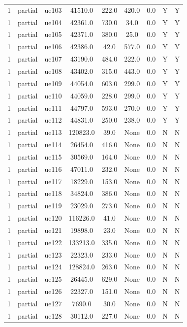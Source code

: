 \begin{table}[ht]
\begin{tabular}{|c|c|c|c|c|c|c|c|c|}
1 & partial & ue103 & 41510.0 & 222.0 & 420.0 & 0.0 & Y & Y \\
1 & partial & ue104 & 42361.0 & 730.0 & 34.0 & 0.0 & Y & Y \\
1 & partial & ue105 & 42371.0 & 380.0 & 25.0 & 0.0 & Y & Y \\
1 & partial & ue106 & 42386.0 & 42.0 & 577.0 & 0.0 & Y & Y \\
1 & partial & ue107 & 43190.0 & 484.0 & 222.0 & 0.0 & Y & Y \\
1 & partial & ue108 & 43402.0 & 315.0 & 443.0 & 0.0 & Y & Y \\
1 & partial & ue109 & 44054.0 & 603.0 & 299.0 & 0.0 & Y & Y \\
1 & partial & ue110 & 44059.0 & 228.0 & 299.0 & 0.0 & Y & Y \\
1 & partial & ue111 & 44797.0 & 593.0 & 270.0 & 0.0 & Y & Y \\
1 & partial & ue112 & 44831.0 & 250.0 & 238.0 & 0.0 & Y & Y \\
1 & partial & ue113 & 120823.0 & 39.0 & None & 0.0 & N & N \\
1 & partial & ue114 & 26454.0 & 416.0 & None & 0.0 & N & N \\
1 & partial & ue115 & 30569.0 & 164.0 & None & 0.0 & N & N \\
1 & partial & ue116 & 47011.0 & 232.0 & None & 0.0 & N & N \\
1 & partial & ue117 & 18229.0 & 153.0 & None & 0.0 & N & N \\
1 & partial & ue118 & 34824.0 & 386.0 & None & 0.0 & N & N \\
1 & partial & ue119 & 23029.0 & 273.0 & None & 0.0 & N & N \\
1 & partial & ue120 & 116226.0 & 41.0 & None & 0.0 & N & N \\
1 & partial & ue121 & 19898.0 & 23.0 & None & 0.0 & N & N \\
1 & partial & ue122 & 133213.0 & 335.0 & None & 0.0 & N & N \\
1 & partial & ue123 & 22323.0 & 233.0 & None & 0.0 & N & N \\
1 & partial & ue124 & 128824.0 & 263.0 & None & 0.0 & N & N \\
1 & partial & ue125 & 26445.0 & 629.0 & None & 0.0 & N & N \\
1 & partial & ue126 & 22327.0 & 151.0 & None & 0.0 & N & N \\
1 & partial & ue127 & 7690.0 & 30.0 & None & 0.0 & N & N \\
1 & partial & ue128 & 30112.0 & 227.0 & None & 0.0 & N & N \\

\end{tabular}
\end{table}
